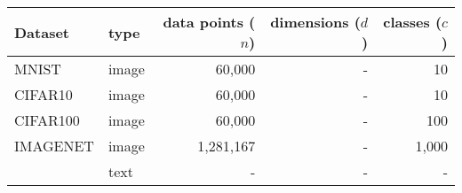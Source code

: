 \begin{tabular}{llrrr}
    \toprule
    Dataset  & type & data points ($n$) & dimensions ($d$) & classes ($c$) \\
    \midrule
    MNIST    & image & 60,000 & - & 10\\
    CIFAR10  & image & 60,000 & - & 10 \\
    CIFAR100 & image & 60,000 & - & 100 \\
    IMAGENET & image & 1,281,167 & - & 1,000\\
     & text & - & - & - \\
    \bottomrule
\end{tabular}
\caption{
}

